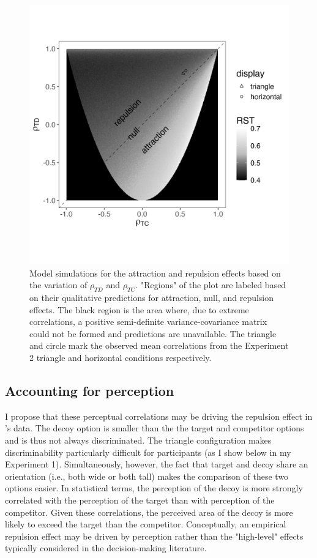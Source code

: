 \begin{figure}
   \includegraphics[width=\linewidth]{figures/3d_sim_rst.jpg}
   \caption{Model simulations for the attraction and repulsion effects based on the variation of $\rho_{TD}$ and $\rho_{TC}$. "Regions" of the plot are labeled based on their qualitative predictions for attraction, null, and repulsion effects. The black region is the area where, due to extreme correlations, a positive semi-definite variance-covariance matrix could not be formed and predictions are unavailable. The triangle and circle mark the observed mean correlations from the Experiment 2 triangle and horizontal conditions respectively.}
   \label{fig:3d_model}
\end{figure}

\subsection{Accounting for perception}
I propose that these perceptual correlations may be driving the repulsion effect in \textcite{spektorWhenGoodLooks2018b}'s data. The decoy option is smaller than the the target and competitor options and is thus not always discriminated. The triangle configuration makes discriminability particularly difficult for participants (as I show below in my Experiment 1). Simultaneously, however, the fact that target and decoy share an orientation (i.e., both wide or both tall) makes the comparison of these two options easier. In statistical terms, the perception of the decoy is more strongly correlated with the perception of the target than with perception of the competitor. Given these correlations, the perceived area of the decoy is more likely to exceed the target than the competitor. Conceptually, an empirical repulsion effect may be driven by perception rather than the "high-level" effects typically considered in the decision-making literature.

